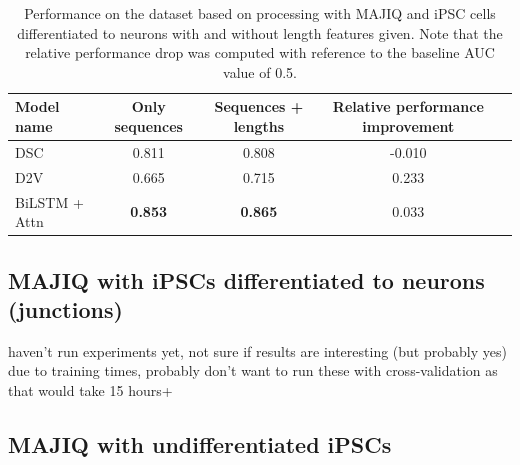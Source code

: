 


\begin{table}[h!]
	\centering
	\begin{tabular}{| l | c | c | c| c} 
		\hline
		Model name & Only sequences & Sequences + lengths & Relative performance improvement\\
		\hline
		DSC & 0.811 & 0.808 & -0.010\\
		D2V & 0.665 & 0.715 & 0.233\\
		BiLSTM + Attn & \textbf{0.853} & \textbf{0.865} & 0.033\\
		\hline
	\end{tabular}
	\caption{Performance on the dataset based on processing with MAJIQ and iPSC cells differentiated to neurons with and without length features given. Note that the relative performance drop was computed with reference to the baseline AUC value of 0.5.
	}
	\label{table:majiq_nolens}
\end{table}



\subsection{MAJIQ with iPSCs differentiated to neurons (junctions)}
haven't run experiments yet, not sure if results are interesting (but probably yes)\\
due to training times, probably don't want to run these with cross-validation as that would take 15 hours+


\subsection{MAJIQ with undifferentiated iPSCs} \label{subsec:hipsci_ipsc_majiq}

